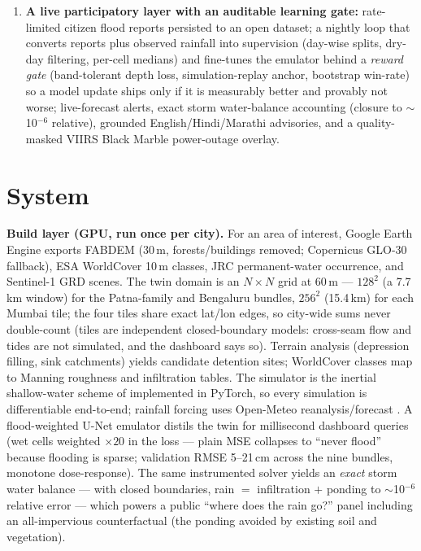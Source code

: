 \documentclass[10pt]{article}
\begin{document}
\begin{enumerate}
        sited only on physically available ground (building footprints and permanent water
        excluded via rasterized OSM and WorldCover; under-street detention allowed, as Indian
        cities actually build it), each site sized to its own local pooled depth, with the flood
        cut \emph{re-measured} after placement and delivered as a 10/20/40\%-cut phase ladder with
        indicative civil-works costs. Buildability costs some hydraulic efficiency on flats and we
        report that honestly; in dense terrain it \emph{improves} drain hydraulics (streets trace
        drainage valleys).
  \item \textbf{A live participatory layer with an auditable learning gate:} rate-limited citizen
        flood reports \citep{assumpcao2018} persisted to an open dataset; a nightly loop that
        converts reports plus observed rainfall into supervision (day-wise splits, dry-day
        filtering, per-cell medians) and fine-tunes the emulator behind a \emph{reward gate}
        (band-tolerant depth loss, simulation-replay anchor, bootstrap win-rate) so a model update
        ships only if it is measurably better and provably not worse; live-forecast alerts, exact
        storm water-balance accounting (closure to $\sim$10$^{-6}$ relative), grounded
        English/Hindi/Marathi advisories, and a quality-masked VIIRS Black Marble
        \citep{roman2018} power-outage overlay.
\end{enumerate}

\section{System}
\label{sec:system}
\textbf{Build layer (GPU, run once per city).} For an area of interest, Google Earth Engine exports
FABDEM (30\,m, forests/buildings removed; Copernicus GLO-30 fallback), ESA WorldCover 10\,m classes,
JRC permanent-water occurrence, and Sentinel-1 GRD scenes. The twin domain is an $N\times N$ grid at
60\,m --- $128^2$ (a 7.7\,km window) for the Patna-family and Bengaluru bundles, $256^2$ (15.4\,km)
for each Mumbai tile; the four tiles share exact lat/lon edges, so city-wide sums never double-count
(tiles are independent closed-boundary models: cross-seam flow and tides are not simulated, and the
dashboard says so). Terrain analysis (depression filling, sink catchments) yields candidate
detention sites; WorldCover classes map to Manning roughness and infiltration tables. The simulator
is the inertial shallow-water scheme of \citet{bates2010} implemented in PyTorch, so every
simulation is differentiable end-to-end; rainfall forcing uses Open-Meteo reanalysis/forecast
\citep{openmeteo}. A flood-weighted U-Net emulator distils the twin for millisecond dashboard
queries (wet cells weighted $\times20$ in the loss --- plain MSE collapses to ``never flood'' because
flooding is sparse; validation RMSE 5--21\,cm across the nine bundles, monotone dose-response). The
same instrumented solver yields an \emph{exact} storm water balance --- with closed boundaries, rain
$=$ infiltration $+$ ponding to $\sim$10$^{-6}$ relative error --- which powers a public
``where does the rain go?'' panel including an all-impervious counterfactual (the ponding avoided by
existing soil and vegetation).
\end{document}
